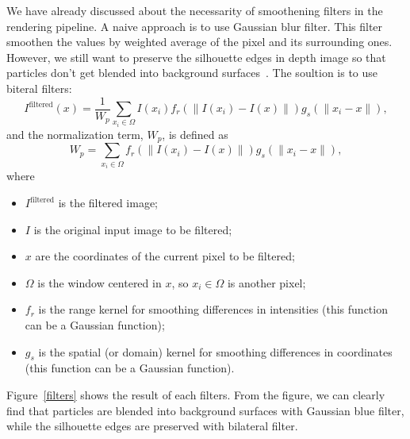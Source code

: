 \documentclass[sigconf]{acmart}
\begin{document}
We have already discussed about the necessarity of smoothening filters in the rendering pipeline. A naive approach is to use Gaussian blur filter. This filter smoothen the values by weighted average of the pixel and its surrounding ones. However, we still want to preserve the silhouette edges in depth image so that particles don't get blended into background surfaces~\cite{screennvidia}. The soultion is to use biteral filters:
\begin{equation}
  I^\text{filtered}(x) = \frac{1}{W_p} \sum_{x_i \in \Omega} I(x_i)f_r(\|I(x_i) - I(x)\|)g_s(\|x_i - x\|),
\end{equation}
and the normalization term, $W_{p}$, is defined as
\begin{equation}
  W_p = \sum_{x_i \in \Omega}{f_r(\|I(x_i) - I(x)\|)g_s(\|x_i - x\|)},
\end{equation}
where
\begin{itemize}
  \item ${I^{\text{filtered}}}$ is the filtered image;
  \item $I$ is the original input image to be filtered;
  \item $x$ are the coordinates of the current pixel to be filtered;
  \item $\Omega$ is the window centered in $x$, so $x_{i}\in \Omega$ is another pixel;
  \item $f_{r}$ is the range kernel for smoothing differences in intensities (this function can be a Gaussian function);
  \item $g_{s}$ is the spatial (or domain) kernel for smoothing differences in coordinates (this function can be a Gaussian function).
\end{itemize}

Figure~\ref{filters} shows the result of each filters. From the figure, we can clearly find that particles are blended into background surfaces with Gaussian blue filter, while the silhouette edges are preserved with bilateral filter.
\end{document}
